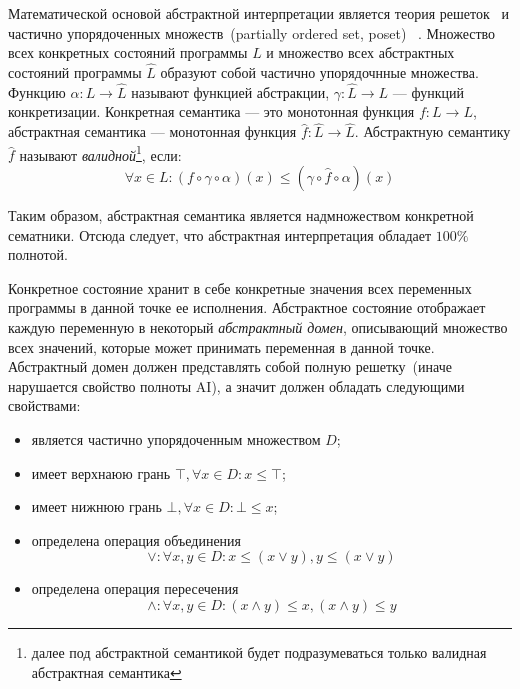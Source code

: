 Математической основой абстрактной интерпретации является теория решеток~\cite{
lattice} и частично упорядоченных множеств~(partially ordered set, poset)
~\cite{poset}. Множество всех конкретных состояний программы $L$ и множество
всех абстрактных состояний программы $\hat{L}$ образуют собой частично 
упорядочнные множества. Функцию $\alpha: L \rightarrow \hat{L}$ называют 
функцией абстракции, $\gamma: \hat{L} \rightarrow L$ --- функций конкретизации.
Конкретная семантика --- это монотонная функция $f: L \rightarrow L$, 
абстрактная семантика --- монотонная функция $\hat{f}: \hat{L} \rightarrow \hat
{L}$. Абстрактную семантику $\hat{f}$ называют \emph{валидной}\footnote{далее
под абстрактной семантикой будет подразумеваться только валидная абстрактная
семантика}, если:
\begin{equation*}
\forall x \in L: (f \circ \gamma \circ \alpha)(x) \le (\gamma \circ \hat{f} 
\circ \alpha)(x)
\end{equation*}

Таким образом, абстрактная семантика является надмножеством конкретной 
сематники. Отсюда следует, что абстрактная интерпретация обладает $100\%$ 
полнотой.

Конкретное состояние хранит в себе конкретные значения всех переменных 
программы в данной точке ее исполнения. Абстрактное состояние отображает каждую
переменную в некоторый \emph{абстрактный домен}, описывающий множество всех
значений, которые может принимать переменная в данной точке. Абстрактный домен
должен представлять собой полную решетку~(иначе нарушается свойство полноты 
AI), а значит должен обладать следующими свойствами:
\begin{itemize}
\item является частично упорядоченным множеством $D$;
\item имеет верхнаюю грань $\top, \forall x \in D: x \le \top$;
\item имеет нижнюю грань $\bot, \forall x \in D: \bot \le x$;
\item определена операция объединения
\begin{equation*}
\vee: \forall x, y \in D: x \le (x \vee y), y \le (x \vee y)
\end{equation*}
\item определена операция пересечения
\begin{equation*}
\wedge: \forall x, y \in D: (x \wedge y) \le x, (x \wedge y) \le y
\end{equation*}
\end{itemize}

